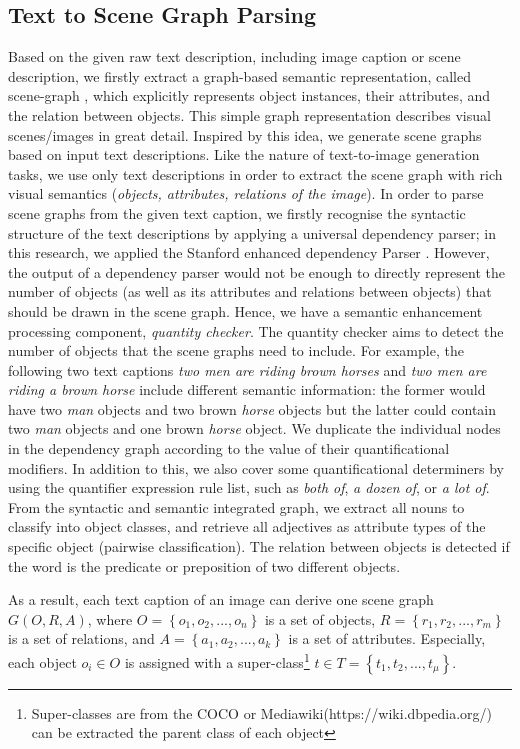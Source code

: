 \documentclass[11pt]{article}
\begin{document}
\subsection{Text to Scene Graph Parsing}
Based on the given raw text description, including image caption or scene description, we firstly extract a graph-based semantic representation, called scene-graph \cite{johnson2015image}, which explicitly represents object instances, their attributes, and the relation between objects. This simple graph representation describes visual scenes/images in great detail. Inspired by this idea, we generate scene graphs based on input text descriptions. Like the nature of text-to-image generation tasks, we use only text descriptions in order to extract the scene graph with rich visual semantics (\textit{objects, attributes, relations of the image}). In order to parse scene graphs from the given text caption, we firstly recognise the syntactic structure of the text descriptions by applying a universal dependency parser; in this research, we applied the Stanford enhanced dependency Parser \cite{chen-manning-2014-fast}. However, the output of a dependency parser would not be enough to directly represent the number of objects (as well as its attributes and relations between objects) that should be drawn in the scene graph. Hence, we have a semantic enhancement processing component, \textit{quantity checker}. The quantity checker aims to detect the number of objects that the scene graphs need to include. For example, the following two text captions \textit{two men are riding brown horses} and \textit{two men are riding a brown horse} include different semantic information: the former would have two \textit{man} objects and two brown \textit{horse} objects but the latter could contain two \textit{man} objects and one brown \textit{horse} object. We duplicate the individual nodes in the dependency graph according to the value of their quantificational modifiers. In addition to this, we also cover some quantificational determiners by using the quantifier expression rule list, such as \textit{both of},  \textit{a dozen of}, or \textit{a lot of}. From the  syntactic and semantic integrated graph, we extract all nouns to classify into object classes, and retrieve all adjectives as attribute types of the specific object (pairwise classification). The relation between objects is detected if the word is the predicate or preposition of two different objects. 


As a result, each text caption of an image can derive one scene graph $G\left(O, R, A\right)$, where $O=\left\{o_{1}, o_{2}, ..., o_{n}\right\}$ is a set of objects, $R=\left\{r_{1}, r_{2}, ..., r_{m}\right\}$ is a set of relations, and $A=\left\{a_{1}, a_{2}, ..., a_{k}\right\}$ is a set of attributes.  Especially, each object ${o_{i} \in O}$ is assigned with a super-class\footnote{Super-classes are from the COCO or Mediawiki(https://wiki.dbpedia.org/) can be extracted the parent class of each object} $t\in T=\left \{ t_{1},t_{2},...,t_{\mu } \right \} $. 
\end{document}
